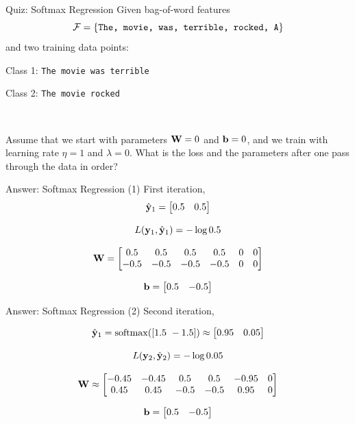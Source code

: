 \documentclass{beamer}
\begin{document}
\begin{frame}{Quiz: Softmax Regression}
  Given bag-of-word features \[\mathcal{F} = \{\mathrm{\texttt{The, movie, was, terrible, rocked, A}} \}\] and two training data points:
    
  \begin{center}
    Class 1: \texttt{The movie was terrible}
  
    Class 2: \texttt{The movie rocked}
  \end{center}
  \\

  \air 

  Assume that we start with parameters $\mathbf{W} = 0$ and $\mathbf{b} = 0$,
  and we train with learning rate $\eta = 1$ and $\lambda = 0$. What is
  the loss and the parameters after one pass through the data in order?
\end{frame}

\begin{frame}{Answer: Softmax Regression (1) }
  First iteration,
  \[\hat{\mathbf{y}}_1 = \begin{bmatrix} 0.5 & 0.5 \end{bmatrix}\]

  \[ L(\mathbf{y}_1, \hat{\mathbf{y}}_1) = - \log 0.5 \]

  \[ \mathbf{W} =
  \begin{bmatrix}
    0.5 & 0.5 & 0.5 & 0.5 & 0 & 0 \\
    -0.5 & -0.5 & -0.5 & -0.5 & 0 & 0 \\
  \end{bmatrix}
  \]

  
  \[ \mathbf{b} =
  \begin{bmatrix}
    0.5 & -0.5 \\
  \end{bmatrix} \]
\end{frame}


\begin{frame}{Answer: Softmax Regression (2) }
  Second iteration,

  \[\hat{\boldy}_1 = \softmax([1.5\ -1.5] ) \approx \begin{bmatrix} 0.95 &  0.05  \end{bmatrix}\]

  \[ L(\mathbf{y}_2, \hat{\mathbf{y}}_2) = - \log 0.05 \]

  \[ \mathbf{W} \approx
  \begin{bmatrix}
    -0.45 & -0.45 & 0.5 & 0.5 & -0.95 & 0 \\
     0.45 & 0.45 & -0.5 & -0.5 & 0.95 & 0 \\
  \end{bmatrix}
  \]

  \[ \mathbf{b} =
  \begin{bmatrix}
    0.5 & -0.5 \\
  \end{bmatrix} \]
\end{frame}
\end{document}
